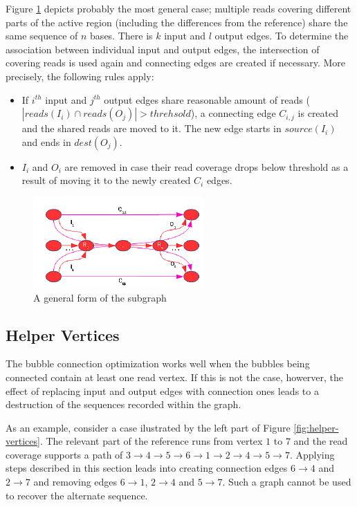 Figure \ref{fig:connection-abstract} depicts probably the most general case; multiple reads covering different parts of the active region (including the differences from the reference) share the same sequence of $n$ bases. There is $k$ input and $l$ output edges. To determine the association between individual input and output edges, the intersection of covering reads is used again and connecting edges are created if necessary. More precisely, the following rules apply:
\begin{itemize}
\item If $i^{th}$ input and $j^{th}$ output edges share reasonable amount of reads ($|reads(I_i) \cap reads(O_j)| > threhsold$), a connecting edge $C_{i,j}$ is created and the shared reads are moved to it. The new edge starts in $source(I_i)$ and ends in $dest(O_j)$.
\item $I_i$ and $O_i$ are removed in case their read coverage drops below threshold as a result of moving it to the newly created $C_i$ edges. 
\end{itemize}

\begin{figure}[h]
	\centering
	\includegraphics{img/connection-abstract.pdf}
	\caption{A general form of the subgraph}
	\label{fig:connection-abstract}
\end{figure}

\subsection{Helper Vertices}
\label{subsec:helper-vertices}

The bubble connection optimization works well when the bubbles being connected contain at least one read vertex. If this is not the case, howerver, the effect of replacing input and output edges with connection ones leads to a destruction of the sequences recorded within the graph.

As an example, consider a case ilustrated by the left part of Figure \ref{fig:helper-vertices}. The relevant part of the reference runs from vertex $1$ to $7$ and the read coverage supports a path of $3 \to 4 \to 5 \to 6 \to 1 \to 2 \to 4 \to 5 \to 7$. Applying steps described in this section leads into creating connection edges $6 \to 4$ and $2 \to 7$ and removing edges $6 \to 1$, $2 \to 4$ and $5 \to 7$. Such a graph cannot be used to recover the alternate sequence.


